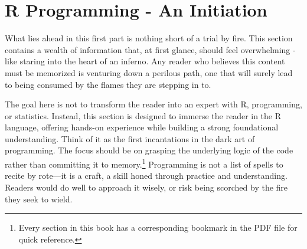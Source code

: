 \part{R Programming - An Initiation}

What lies ahead in this first part is nothing short of a trial by fire. This section contains a wealth of information that, at first glance, should feel overwhelming - like staring into the heart of an inferno. Any reader who believes this content must be memorized is venturing down a perilous path, one that will surely lead to being consumed by the flames they are stepping in to.

The goal here is not to transform the reader into an expert with R, programming, or statistics. Instead, this section is designed to immerse the reader in the R language, offering hands-on experience while building a strong foundational understanding. Think of it as the first incantations in the dark art of programming. The focus should be on grasping the underlying logic of the code rather than committing it to memory.\footnote{Every section in this book has a corresponding bookmark in the PDF file for quick reference.} Programming is not a list of spells to recite by rote—it is a craft, a skill honed through practice and understanding. Readers would do well to approach it wisely, or risk being scorched by the fire they seek to wield.
